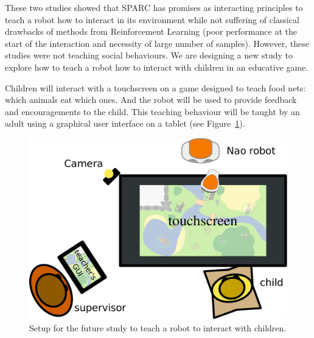 \documentclass[conference]{IEEEtran}
\begin{document}
These two studies showed that SPARC has promises as interacting principles to
teach a robot how to interact in its environment while not suffering of
classical drawbacks of methods from Reinforcement Learning (poor performance at
the start of the interaction and necessity of large number of samples). However,
these studies were not teaching social behaviours. We are designing a new study
to explore how to teach a robot how to interact with children in an educative
game. 

Children will interact with a touchscreen on a game designed to teach food nets:
which animals eat which ones. And the robot will be used to provide feedback
and encouragements to the child. This teaching behaviour will be taught by an
adult using a graphical user interface on a tablet (see Figure~\ref{fig:setup}).

\begin{figure}
    \centering
    \includegraphics[width=0.9\linewidth]{setup.pdf}
    \caption{Setup for the future study to teach a robot to interact with
    children.}
    \label{fig:setup}
\end{figure}






 
\end{document}
